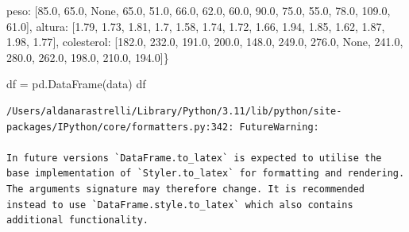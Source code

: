 \documentclass[
  letterpaper,
  DIV=11,
  numbers=noendperiod]{scrreprt}
\newenvironment{Shaded}{\begin{snugshade}}{\end{snugshade}}
\newcommand{\FloatTok}[1]{\textcolor[rgb]{0.68,0.00,0.00}{#1}}
\newcommand{\NormalTok}[1]{\textcolor[rgb]{0.00,0.23,0.31}{#1}}
\newcommand{\OperatorTok}[1]{\textcolor[rgb]{0.37,0.37,0.37}{#1}}
\newcommand{\StringTok}[1]{\textcolor[rgb]{0.13,0.47,0.30}{#1}}
\newcommand{\VariableTok}[1]{\textcolor[rgb]{0.07,0.07,0.07}{#1}}
\begin{document}
\begin{Shaded}
\begin{Highlighting}[]
        \StringTok{\textquotesingle{}peso\textquotesingle{}}\NormalTok{: [}\FloatTok{85.0}\NormalTok{, }\FloatTok{65.0}\NormalTok{, }\VariableTok{None}\NormalTok{, }\FloatTok{65.0}\NormalTok{, }\FloatTok{51.0}\NormalTok{, }\FloatTok{66.0}\NormalTok{, }\FloatTok{62.0}\NormalTok{, }\FloatTok{60.0}\NormalTok{, }\FloatTok{90.0}\NormalTok{, }\FloatTok{75.0}\NormalTok{, }\FloatTok{55.0}\NormalTok{, }\FloatTok{78.0}\NormalTok{, }\FloatTok{109.0}\NormalTok{, }\FloatTok{61.0}\NormalTok{],}
        \StringTok{\textquotesingle{}altura\textquotesingle{}}\NormalTok{: [}\FloatTok{1.79}\NormalTok{, }\FloatTok{1.73}\NormalTok{, }\FloatTok{1.81}\NormalTok{, }\FloatTok{1.7}\NormalTok{, }\FloatTok{1.58}\NormalTok{, }\FloatTok{1.74}\NormalTok{, }\FloatTok{1.72}\NormalTok{, }\FloatTok{1.66}\NormalTok{, }\FloatTok{1.94}\NormalTok{, }\FloatTok{1.85}\NormalTok{, }\FloatTok{1.62}\NormalTok{, }\FloatTok{1.87}\NormalTok{, }\FloatTok{1.98}\NormalTok{, }\FloatTok{1.77}\NormalTok{],}
        \StringTok{\textquotesingle{}colesterol\textquotesingle{}}\NormalTok{: [}\FloatTok{182.0}\NormalTok{, }\FloatTok{232.0}\NormalTok{, }\FloatTok{191.0}\NormalTok{, }\FloatTok{200.0}\NormalTok{, }\FloatTok{148.0}\NormalTok{, }\FloatTok{249.0}\NormalTok{, }\FloatTok{276.0}\NormalTok{, }\VariableTok{None}\NormalTok{, }\FloatTok{241.0}\NormalTok{, }\FloatTok{280.0}\NormalTok{, }\FloatTok{262.0}\NormalTok{, }\FloatTok{198.0}\NormalTok{, }\FloatTok{210.0}\NormalTok{, }\FloatTok{194.0}\NormalTok{]\}}

\NormalTok{df }\OperatorTok{=}\NormalTok{ pd.DataFrame(data)}
\NormalTok{df}
\end{Highlighting}
\end{Shaded}

\begin{verbatim}
/Users/aldanarastrelli/Library/Python/3.11/lib/python/site-packages/IPython/core/formatters.py:342: FutureWarning:

In future versions `DataFrame.to_latex` is expected to utilise the base implementation of `Styler.to_latex` for formatting and rendering. The arguments signature may therefore change. It is recommended instead to use `DataFrame.style.to_latex` which also contains additional functionality.
\end{verbatim}
\end{document}
